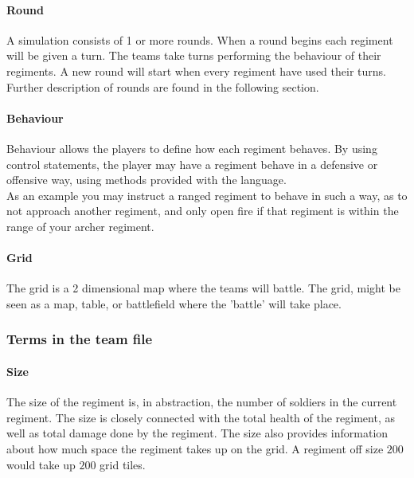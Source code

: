 		\paragraph{Round}
		A simulation consists of 1 or more rounds. When a round begins each regiment will be given a turn.
		The teams take turns performing the behaviour of their regiments. 
		A new round will start when every regiment have used their turns.
		Further description of rounds are found in the following section.

		\paragraph{Behaviour}
		Behaviour allows the players to define how each regiment behaves. 
		By using control statements, the player may have a regiment behave in a defensive or offensive way, 
		using methods provided with the language. \\
		As an example you may instruct a ranged regiment to behave in such a way, 
		as to not approach another regiment, and only open fire if that regiment is within the range of your archer regiment.
				
		\paragraph{Grid}
		The grid is a 2 dimensional map where the teams will battle.
		The grid, might be seen as a map, table, or battlefield where the 'battle' will take place. 
																		
		\subsubsection{Terms in the team file }
	
		\paragraph{Size}
		The size of the regiment is, in abstraction, the number of soldiers in the current regiment. 
		The size is closely connected with the total health of the regiment, as well as total damage done by the regiment.
		The size also provides information about how much space the regiment takes up on the grid. A regiment off size $200$ would take up $200$ grid tiles.

